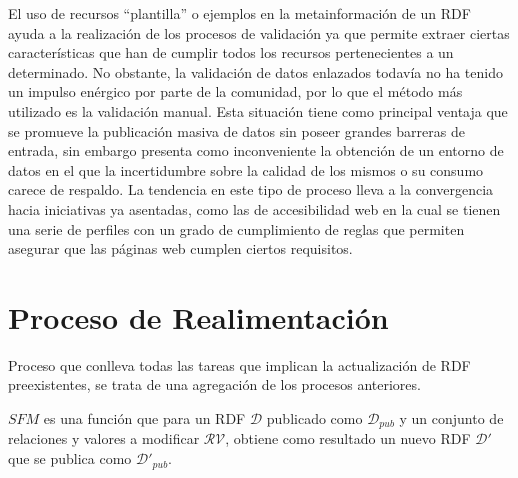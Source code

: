 El uso de recursos ``plantilla'' o ejemplos en la metainformación de un \dataset RDF ayuda a la realización de 
los procesos de validación ya que permite extraer ciertas características
que han de cumplir todos los recursos pertenecientes a un \dataset determinado. No obstante,
la validación de datos enlazados todavía no ha tenido un impulso enérgico por parte
de la comunidad, por lo que el método más utilizado es la validación manual. Esta situación
tiene como principal ventaja que se promueve la publicación masiva de datos sin poseer grandes barreras de entrada, sin embargo presenta como inconveniente la obtención 
de un entorno de datos en el que la incertidumbre sobre la calidad de los mismos o su consumo carece de respaldo. 
La tendencia en este tipo de proceso lleva a la convergencia hacia iniciativas ya asentadas, 
como las de accesibilidad web en la cual se tienen una serie de perfiles con un grado de cumplimiento de reglas que permiten asegurar que las páginas web cumplen ciertos
requisitos. 


\section{Proceso de Realimentación}\label{proceso-realimentacion}
\begin{definition}[Realimentación]
Proceso que conlleva todas las tareas que implican la actualización de \datasets \gls{RDF} preexistentes, se trata de una agregación de los procesos anteriores.
\end{definition}

\begin{definition}
$SFM$ es una función que para un \dataset RDF $\mathcal{D}$ publicado como $\mathcal{D}_{pub}$ y un conjunto de relaciones y 
valores a modificar $\mathcal{RV}$, obtiene como resultado un nuevo \dataset RDF $\mathcal{D}'$ que se publica como $\mathcal{D}'_{pub}$.
\end{definition}

